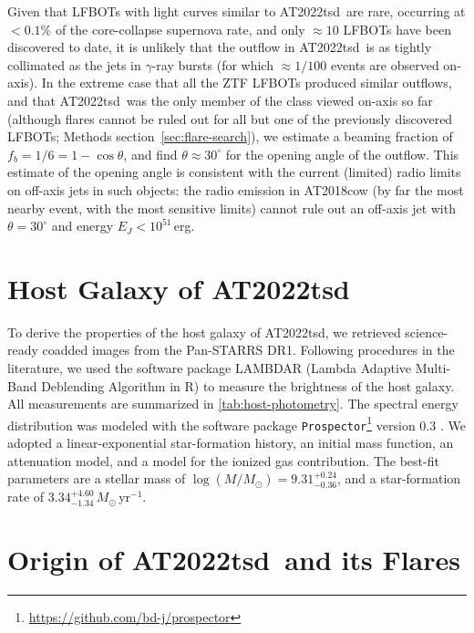 \documentclass{nature_plusfigure}
\newcommand{\at}{AT2022tsd}
\begin{document}
\begin{methods}
Given that LFBOTs with light curves similar to \at\ are rare, occurring at $<0.1\%$ of the core-collapse supernova rate\cite{Ho2022_RET}, and only $\approx10$ LFBOTs have been discovered to date, it is unlikely that the outflow in \at\ is as tightly collimated as the jets in $\gamma$-ray bursts (for which $\approx1/100$ events are observed on-axis).
In the extreme case that all the ZTF LFBOTs produced similar outflows, and that \at\ was the only member of the class viewed on-axis so far (although flares cannot be ruled out for all but one of the previously discovered LFBOTs; Methods section~\ref{sec:flare-search}), we estimate a beaming fraction of $f_b = 1/6 = 1-\cos{\theta}$, and find $\theta\approx30^{\circ}$ for the opening angle of the outflow. This estimate of the opening angle is consistent with the current (limited) radio limits on off-axis jets in such objects: the radio emission in AT2018cow (by far the most nearby event, with the most sensitive limits) cannot\cite{Margutti2019} rule out an off-axis jet with $\theta=30^{\circ}$ and energy $E_J<10^{51}\,$erg.%

\section{Host Galaxy of \at}
\label{sec:hostgalaxy}

To derive the properties of the host galaxy of \at, we retrieved science-ready coadded images from the Pan-STARRS DR1\cite{Chambers2016}. Following procedures in the literature\cite{Schulze2021}, we used the software package LAMBDAR\cite{Wright2016}  (Lambda Adaptive Multi-Band Deblending Algorithm in R) to measure the brightness of the host galaxy. All measurements are summarized in \ref{tab:host-photometry}. The spectral energy distribution was modeled with the software package \texttt{Prospector}\footnote{\href{https://github.com/bd-j/prospector}{https://github.com/bd-j/prospector}} version 0.3 \cite{Johnson2021}. We adopted a linear-exponential star-formation history, an initial mass function\cite{Chabrier2003}, an attenuation model\cite{Calzetti2000}, and a model\cite{Byler2017} for the ionized gas contribution. 
The best-fit parameters are a stellar mass of $\log(M/M_\odot)=9.31^{+0.24}_{-0.36}$, and a star-formation rate of $3.34^{+4.60}_{-1.34}\,M_\odot\,$yr$^{-1}$.

\section{Origin of \at\ and its Flares}
\label{sec:at2022tsd-origin}


\end{methods}
\end{document}
